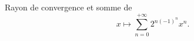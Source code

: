 \begin{enonce}
\begin{exercise}[ID={RMS 122-2 E1257 Autres écoles PSI},subtitle={},tags={}, difficulty={0}]
Rayon de convergence et somme de
\begin{equation*}
  x\mapsto \sum_{n=0}^{+\infty} 2^{n(-1)^n} x^n.
\end{equation*}
\end{exercise}
\begin{solution}
\end{solution}
\end{enonce}
